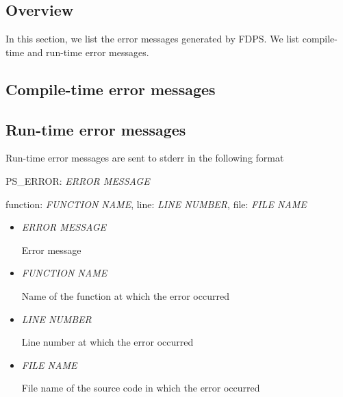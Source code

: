 \subsection{Overview}

In this section, we list the error messages generated by FDPS.
We list compile-time and run-time error messages.


\subsection{Compile-time error messages}

\subsection{Run-time error messages}

Run-time error messages are sent to stderr in the following format


\begin{screen}
  PS\_ERROR: \textit{ERROR MESSAGE}
  
  function: \textit{FUNCTION NAME}, line: \textit{LINE NUMBER}, file:
  \textit{FILE NAME}
\end{screen}

\begin{itemize}
\item \textit{ERROR MESSAGE}

  Error message

\item \textit{FUNCTION NAME}

  Name of the function at which the error occurred



\item \textit{LINE NUMBER}

  Line number  at which the error occurred
  
\item \textit{FILE NAME}

  File name of the source code  in which the error occurred
    
\end{itemize}




